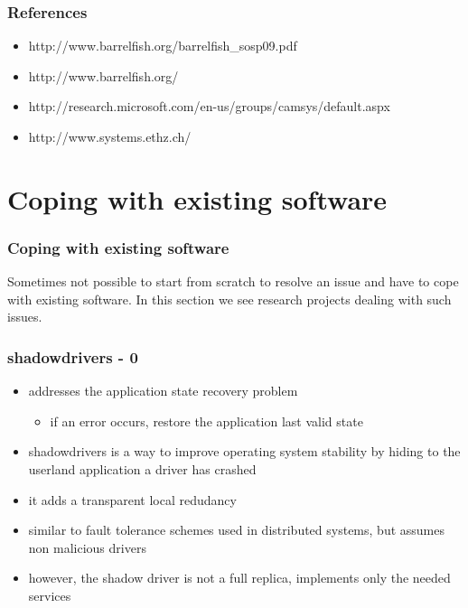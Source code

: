 
\begin{frame}
\frametitle{References}
\begin{itemize}
  \item http://www.barrelfish.org/barrelfish\_sosp09.pdf
  \item http://www.barrelfish.org/
  \item http://research.microsoft.com/en-us/groups/camsys/default.aspx
  \item http://www.systems.ethz.ch/
\end{itemize}
\end{frame}



\section{Coping with existing software}

\begin{frame}
  \frametitle{Coping with existing software}
  Sometimes not possible to start from scratch to resolve an issue and have to cope with
  existing software. In this section we see research projects dealing with such issues.
\end{frame}


\begin{frame}
  \frametitle{shadowdrivers - 0}
  \begin{itemize}
    \item addresses the application state recovery problem
    \begin{itemize} \item if an error occurs, restore the application last valid state \end{itemize}
    \item shadowdrivers is a way to improve operating system stability by hiding to the userland application a driver has crashed
    \item it adds a transparent local redudancy
    \item similar to fault tolerance schemes used in distributed systems, but assumes non malicious drivers
    \item however, the shadow driver is not a full replica, implements only the needed services
  \end{itemize}
\end{frame}


